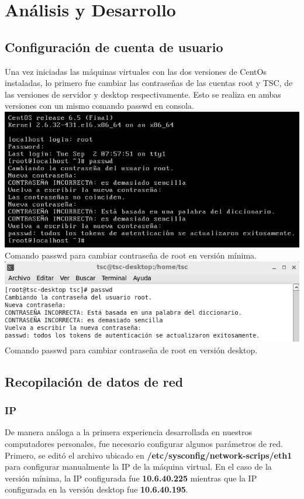 \documentclass[11pt]{article}
\begin{document}
\section{Análisis y Desarrollo}
\subsection{Configuración de cuenta de usuario}
Una vez iniciadas las máquinas virtuales con las dos versiones de CentOs instaladas, lo primero fue cambiar las contraseñas de las cuentas root y TSC, de las versiones de servidor y desktop respectivamente. Esto se realiza en ambas versiones con un mismo comando passwd en consola.\\
	
\includegraphics[width=.75\linewidth]{screenshots/minimal/passwd.png}
    \\Comando passwd para cambiar contraseña de root en versión mínima.\\

\includegraphics[width=.75\linewidth]{screenshots/desktop/passwd.png}
    \\Comando passwd para cambiar contraseña de root en versión desktop.\\
    
\subsection{Recopilación de datos de red}
\subsubsection{IP}
De manera análoga a la primera experiencia desarrollada en nuestros computadores personales, fue necesario configurar algunos parámetros de red. Primero, se editó el archivo ubicado en \textbf{/etc/sysconfig/network-scrips/eth1} para configurar manualmente la IP de la máquina virtual. En el caso de la versión mínima, la IP configurada fue \textbf{10.6.40.225} mientras que la IP configurada en la versión desktop fue \textbf{10.6.40.195}.\\
\end{document}
